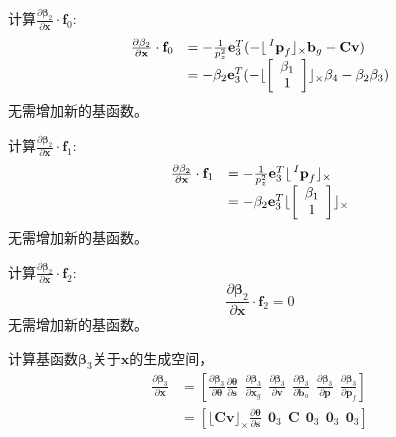 \documentclass{article}
\begin{document}
\par
计算$\frac{\partial\mathbf{\beta}_2}{\partial\textbf{x}}\cdot\textbf{f}_0$:
\begin{equation}
    \begin{array}{ll}
        \frac{\partial\mathbf{\beta}_2}{\partial\textbf{x}}\cdot\textbf{f}_0
        &=-\frac{1}{p_z^2}\textbf{e}_{3}^{T}(-\lfloor\sideset{^I}{}{\mathop{\textbf{p}_{f}}}\rfloor_{\times}\textbf{b}_{g}-\textbf{Cv})\\
        &=-\mathbf{\beta}_{2}\textbf{e}_{3}^{T}(-\lfloor\left[\begin{array}{c}\mathbf{\beta}_1\\1 \end{array}\right] \rfloor_{\times}
            \mathbf{\beta}_{4}-\mathbf{\beta}_{2}\mathbf{\beta}_{3})
    \end{array}
\end{equation}
无需增加新的基函数。

\par
计算$\frac{\partial\mathbf{\beta}_2}{\partial\textbf{x}}\cdot\textbf{f}_1$:
\begin{equation}
    \begin{array}{ll}
        \frac{\partial\mathbf{\beta}_2}{\partial\textbf{x}}\cdot\textbf{f}_1
        &=-\frac{1}{p_z^2}\textbf{e}_{3}^{T}\lfloor\sideset{^I}{}{\mathop{\textbf{p}_{f}}}\rfloor_{\times}\\
        &=-\mathbf{\beta}_{2}\textbf{e}_{3}^{T}\lfloor\left[\begin{array}{c}\mathbf{\beta}_1\\1 \end{array}\right] \rfloor_{\times}
    \end{array}
\end{equation}
无需增加新的基函数。

\par
计算$\frac{\partial\mathbf{\beta}_2}{\partial\textbf{x}}\cdot\textbf{f}_2$:
\begin{equation}
    \frac{\partial\mathbf{\beta}_2}{\partial\textbf{x}}\cdot\textbf{f}_2=0
\end{equation}
无需增加新的基函数。

\par
计算基函数$\mathbf{\beta}_3$关于$\textbf{x}$的生成空间，
\begin{equation}
    \begin{array}{ll}\frac{\partial\mathbf{\beta}_3}{\partial\textbf{x}}
        &=\left[\frac{\partial\mathbf{\beta}_3}{\partial\mathbf{\theta}}\frac{\partial\mathbf{\theta}}{\partial\textbf{s}}
        \ \ \frac{\partial\mathbf{\beta}_3}{\partial\textbf{x}_{g}}\ \ \frac{\partial\mathbf{\beta}_3}{\partial\textbf{v}}
        \ \ \frac{\partial\mathbf{\beta}_3}{\partial\textbf{b}_{a}}\ \ \frac{\partial\mathbf{\beta}_3}{\partial\textbf{p}}
        \ \ \frac{\partial\mathbf{\beta}_3}{\partial\textbf{p}_f}\right]\\
        &=\left[\lfloor\textbf{Cv}\rfloor_{\times}\frac{\partial\mathbf{\theta}}{\partial\textbf{s}}
        \ \ \textbf{0}_3\ \ \textbf{C}\ \ \textbf{0}_3\ \ \textbf{0}_3\ \ \textbf{0}_3
        \right]
    \end{array}
\end{equation}
\end{document}
